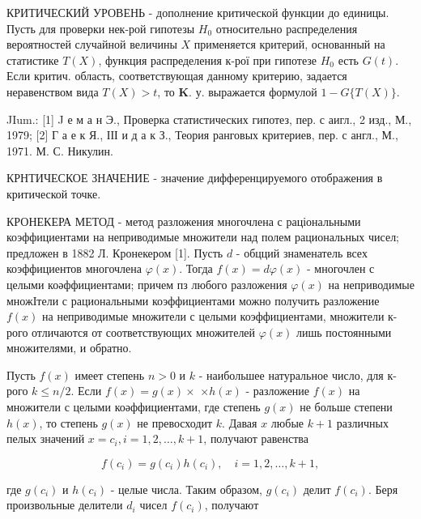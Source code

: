 \documentclass[10pt]{article}
\begin{document}
КРИТИЧЕСКИЙ УРОВЕНЬ - дополнение критической функции до единицы. Пусть для проверки нек-рой гипотезы $H_{0}$ относительно распределения вероятностей случайной величины $X$ применяется критерий, основанный на статистике $T(X)$, функция распределения к-рої при гипотезе $H_{0}$ есть $G(t)$. Если критич. область, соответствующая данному критерию, задается неравенством вида $T(X)>t$, то $\mathbf{K}$. у. выражается формулой $1-G\{T(X)\}$.



JIum.: [1] J е м а н Э., Проверка статистических гипотез, пер. с аигл., 2 изд., М., 1979; [2] Г а е к Я., ІІІ и д а к З., Теория ранговых критериев, пер. с англ., М., 1971. М. С. Никулин.



КРНТИЧЕСКОЕ ЗНАЧЕНИЕ - значение дифференцируемого отображения в критической точке.



КРОНЕКЕРА МЕТОД - метод разложения многочлена с раціональными коэффициентами на неприводимые множители над полем рациональных чисел; предложен в 1882 Л. Кронекером [1]. Пусть $d$ - обцций знаменатель всех коэффициентов многочлена $\varphi(x)$. Тогда $f(x)=d \varphi(x)$ - многочлен с целыми коәффициентами; причем пз любого разложения $\varphi(x)$ на неприводимые множІтели с рациональными коэффициентами можно получить разложение $f(x)$ на неприводимые множители с целыми коэффициентами, множители к-рого отличаются от соответствующих множителей $\varphi(x)$ лишь постоянными множителями, и обратно.



Пусть $f(x)$ имеет степень $n>0$ и $k$ - наибольшее натуральное число, для к-рого $k \leqslant n / 2$. Если $f(x)=g(x) \times$ $\times h(x)$ - разложение $f(x)$ на множители с целыми коәффициентами, где степень $g(x)$ не больше степени $h(x)$, то степень $g(x)$ не превосходит $k$. Давая $x$ любые $k+1$ различных пелых значений $x=c_{i}, i=1,2, \ldots, k+1$, получают равенства



\[

f\left(c_{i}\right)=g\left(c_{i}\right) h\left(c_{i}\right), \quad i=1,2, \ldots, k+1,

\]



где $g\left(c_{i}\right)$ и $h\left(c_{i}\right)$ - целые числа. Таким образом, $g\left(c_{i}\right)$ делит $f\left(c_{i}\right)$. Беря произвольные делители $d_{i}$ чисел $f\left(c_{i}\right)$, получают
\end{document}

